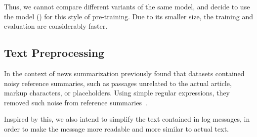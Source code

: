 Thus, we cannot compare different variants of the same model,
and decide to use the model  () for this style of pre-training.
Due to its smaller size, the training and evaluation are considerably faster.

%
%
%

\subsection{Text Preprocessing}\label{subsec:preprocessing}

In the context of news summarization \citeauthor*{summarization_critical_evaluation}
previously found that datasets contained noisy reference summaries,
such as passages unrelated to the actual article, markup characters, or placeholders.
Using simple regular expressions, they removed such noise from reference summaries~\parencite[544-545]{summarization_critical_evaluation}.

Inspired by this, we also intend to simplify the text contained in log messages,
in order to make the message more readable and more similar to actual text.

\newcommand{\identifier}[1]{\textcolor{orange!50!black}{\textit{#1}}}
\newcommand{\classname}[1]{\textcolor{green!50!black}{\textbf{#1}}}
\newcommand{\pathuri}[1]{\textcolor{blue!50!black}{\underline{#1}}}
\newcommand{\address}[1]{\textcolor{cyan!50!black}{#1}}
\newcommand{\fallback}[1]{\textcolor{purple!75!black}{\textbf{#1}}}

